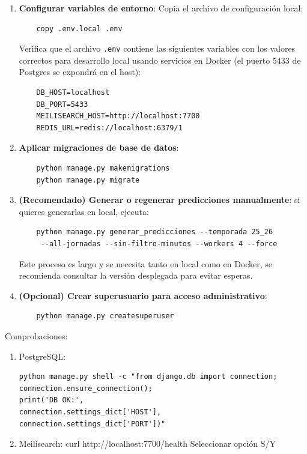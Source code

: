\begin{enumerate}
    \item \textbf{Configurar variables de entorno}: Copia el archivo de configuración local:
    \begin{verbatim}
    copy .env.local .env
    \end{verbatim}
    
    Verifica que el archivo \texttt{.env} contiene las siguientes variables con los valores correctos para desarrollo local usando servicios en Docker (el puerto 5433 de Postgres se expondrá en el host):
    \begin{verbatim}
    DB_HOST=localhost     
    DB_PORT=5433
    MEILISEARCH_HOST=http://localhost:7700
    REDIS_URL=redis://localhost:6379/1
    \end{verbatim}
    
    \item \textbf{Aplicar migraciones de base de datos}:
    \begin{verbatim}
    python manage.py makemigrations
    python manage.py migrate
    \end{verbatim}

    \item \textbf{(Recomendado) Generar o regenerar predicciones manualmente}: si quieres generarlas en local, ejecuta:
    \begin{verbatim}
    python manage.py generar_predicciones --temporada 25_26
     --all-jornadas --sin-filtro-minutos --workers 4 --force
    \end{verbatim}
    Este proceso es largo y se necesita tanto en local como en Docker, se recomienda consultar la versión desplegada para evitar esperas.

    \item \textbf{(Opcional) Crear superusuario para acceso administrativo}:
    \begin{verbatim}
    python manage.py createsuperuser
    \end{verbatim}
    
\end{enumerate}

Comprobaciones:
\begin{enumerate}
\item PostgreSQL:
\begin{verbatim}
python manage.py shell -c "from django.db import connection; 
connection.ensure_connection(); 
print('DB OK:', 
connection.settings_dict['HOST'], connection.settings_dict['PORT'])"
\end{verbatim}
\item Meilisearch: curl http://localhost:7700/health Seleccionar opción S/Y
\end{enumerate}

